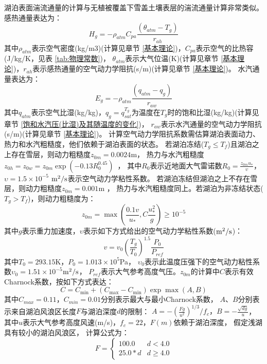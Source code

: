 湖泊表面湍流通量的计算与无植被覆盖下雪盖土壤表层的湍流通量计算非常类似。感热通量表达为：
\begin{equation}
H_{g}=-\rho_{atm} C_{p a} \frac{\left(\theta_{atm}-T_{g}\right)}{r_{a h}}
\end{equation}
其中$\rho_{atm}$表示空气密度(kg/m3)(计算见章节 \ref{基本理论})，$C_{pa}$表示空气的比热容(J/kg/K，见表 \ref{tab:物理常数})，
$\theta_{atm}$表示大气位温(K)(计算见章节 \ref{基本理论})，$r_{ah}$表示感热通量的空气动力学阻抗(s/m)(计算见章节 \ref{基本理论})。
水汽通量表达为：
\begin{equation}
E_{g}=-\rho_{atm} \frac{\left(q_{atm}-q_{g}\right)}{r_{a w}}
\end{equation}
其中$q_{atm}$表示空气比湿(kg/kg)，$q_g=q_{sat}^{T_g}$为温度在$T_g$时的饱和比湿(kg/kg)(计算见章节 \ref{饱和水汽压(比湿)及其随温度的变化})，
$r_{aw}$表示水汽通量的空气动力学阻抗(s/m)(计算见章节 \ref{基本理论})。
计算空气动力学阻抗系数需估算湖泊表面动力、热力和水汽粗糙度，他们依赖于湖泊表面的状态。
若湖泊冻结($T_g\le T_f$)且湖泊之上存在雪层，则动力粗糙度$z_{0m}=0.0024$m，
热力与水汽粗糙度$z_{0h}=z_{0w}=z_{0m}\exp{\left(-0.13R_0^{0.45}\right)}$~\citep{zilitinkevich1972dynamics}，
其中$R_0$表示近地面大气雷诺数$R_0=\frac{z_{0m}u_\ast}{\upsilon}$，
$\upsilon=1.5\times{10}^{-5}$ $\rm m^2/s$表示空气动力学粘性系数。
若湖泊冻结但湖泊之上不存在雪层，则动力粗糙度$z_{0m}=0.001$m \citep{subin2012improved}，
热力与水汽粗糙度同上。若湖泊为非冻结状态($T_g>T_f$)，则动力粗糙度为\citep{subin2012improved}：
\begin{equation}
z_{0 m}=\max \left(\frac{0.1 v}{u_{*}}, C \frac{u_{*}^{2}}{g}\right) \geq 10^{-5}
\end{equation}
其中$g$表示重力加速度，$\upsilon$表示如下方式给出的空气动力学粘性系数($\rm m^2/s$)：
\begin{equation}
v=v_{0}\left(\frac{T_{g}}{T_{0}}\right)^{1.5} \frac{P_{0}}{P_{r e f}}
\end{equation}
其中$T_0=293.15$K，$P_0=1.013\times{10}^5$Pa，
$\upsilon_0$表示此温度压强下的空气动力粘性系数$\upsilon_0=1.51\times{10}^{-5}$$\rm m^2/s$，
$P_{ref}$表示大气参考高度气压。$z_{0m}$的计算中$C$表示有效Charnock系数，按如下方式表达：
\begin{equation}
C=C_{\min }+\left(C_{\max }-C_{\min }\right) \exp \max (A, B)
\end{equation}
其中$C_{max}=0.11$，$C_{min}=0.01$分别表示最大与最小Charnock系数，
$A$、$B$分别表示来自湖泊风浪区长度$F$与湖泊深度$d$的限制：
$A=-\left(\frac{Fg}{u^2}\right)^{1/3}/f_c，B=-\frac{\sqrt{dg}}{u}$，
其中$u$表示大气参考高度风速(m/s)，$f_c=22$，$F(m)$依赖于湖泊深度，
假定浅湖具有较小的湖泊风浪区，
计算公式为：$$F=\left\{\begin{array}{ll}100.0 & d<4.0 \\ 25.0 * d & d \geq 4.0\end{array}\right.$$



